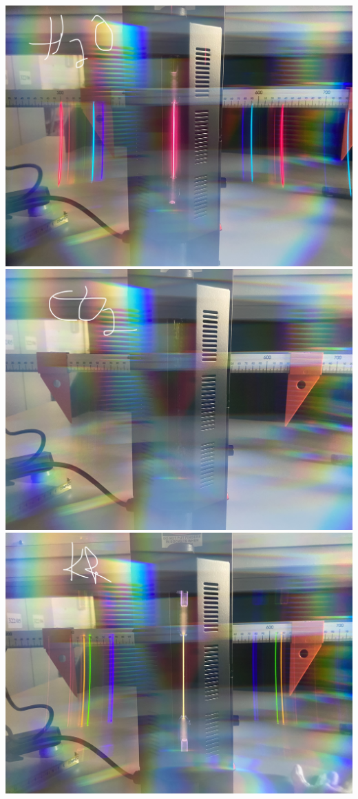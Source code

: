 \documentclass[12pt,oneside,oldfontcommands]{memoir}
\begin{document}
\includegraphics[width=.96\columnwidth]{figures/IMG_5296.jpg}
\includegraphics[width=.96\columnwidth]{figures/IMG_5297.jpg}
\includegraphics[width=.96\columnwidth]{figures/IMG_5298.jpg}
\end{document}

